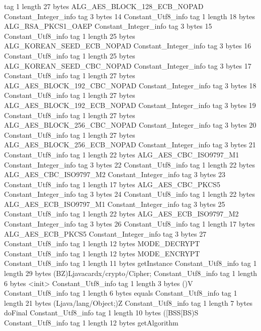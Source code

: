 {{{			tag	1
			length	27
			bytes	ALG_AES_BLOCK_128_ECB_NOPAD
		}
		Constant_Integer_info {
			tag	3
			bytes	14
		}
		Constant_Utf8_info {
			tag	1
			length	18
			bytes	ALG_RSA_PKCS1_OAEP
		}
		Constant_Integer_info {
			tag	3
			bytes	15
		}
		Constant_Utf8_info {
			tag	1
			length	25
			bytes	ALG_KOREAN_SEED_ECB_NOPAD
		}
		Constant_Integer_info {
			tag	3
			bytes	16
		}
		Constant_Utf8_info {
			tag	1
			length	25
			bytes	ALG_KOREAN_SEED_CBC_NOPAD
		}
		Constant_Integer_info {
			tag	3
			bytes	17
		}
		Constant_Utf8_info {
			tag	1
			length	27
			bytes	ALG_AES_BLOCK_192_CBC_NOPAD
		}
		Constant_Integer_info {
			tag	3
			bytes	18
		}
		Constant_Utf8_info {
			tag	1
			length	27
			bytes	ALG_AES_BLOCK_192_ECB_NOPAD
		}
		Constant_Integer_info {
			tag	3
			bytes	19
		}
		Constant_Utf8_info {
			tag	1
			length	27
			bytes	ALG_AES_BLOCK_256_CBC_NOPAD
		}
		Constant_Integer_info {
			tag	3
			bytes	20
		}
		Constant_Utf8_info {
			tag	1
			length	27
			bytes	ALG_AES_BLOCK_256_ECB_NOPAD
		}
		Constant_Integer_info {
			tag	3
			bytes	21
		}
		Constant_Utf8_info {
			tag	1
			length	22
			bytes	ALG_AES_CBC_ISO9797_M1
		}
		Constant_Integer_info {
			tag	3
			bytes	22
		}
		Constant_Utf8_info {
			tag	1
			length	22
			bytes	ALG_AES_CBC_ISO9797_M2
		}
		Constant_Integer_info {
			tag	3
			bytes	23
		}
		Constant_Utf8_info {
			tag	1
			length	17
			bytes	ALG_AES_CBC_PKCS5
		}
		Constant_Integer_info {
			tag	3
			bytes	24
		}
		Constant_Utf8_info {
			tag	1
			length	22
			bytes	ALG_AES_ECB_ISO9797_M1
		}
		Constant_Integer_info {
			tag	3
			bytes	25
		}
		Constant_Utf8_info {
			tag	1
			length	22
			bytes	ALG_AES_ECB_ISO9797_M2
		}
		Constant_Integer_info {
			tag	3
			bytes	26
		}
		Constant_Utf8_info {
			tag	1
			length	17
			bytes	ALG_AES_ECB_PKCS5
		}
		Constant_Integer_info {
			tag	3
			bytes	27
		}
		Constant_Utf8_info {
			tag	1
			length	12
			bytes	MODE_DECRYPT
		}
		Constant_Utf8_info {
			tag	1
			length	12
			bytes	MODE_ENCRYPT
		}
		Constant_Utf8_info {
			tag	1
			length	11
			bytes	getInstance
		}
		Constant_Utf8_info {
			tag	1
			length	29
			bytes	(BZ)Ljavacardx/crypto/Cipher;
		}
		Constant_Utf8_info {
			tag	1
			length	6
			bytes	<init>
		}
		Constant_Utf8_info {
			tag	1
			length	3
			bytes	()V
		}
		Constant_Utf8_info {
			tag	1
			length	6
			bytes	equals
		}
		Constant_Utf8_info {
			tag	1
			length	21
			bytes	(Ljava/lang/Object;)Z
		}
		Constant_Utf8_info {
			tag	1
			length	7
			bytes	doFinal
		}
		Constant_Utf8_info {
			tag	1
			length	10
			bytes	([BSS[BS)S
		}
		Constant_Utf8_info {
			tag	1
			length	12
			bytes	getAlgorithm
}}}
